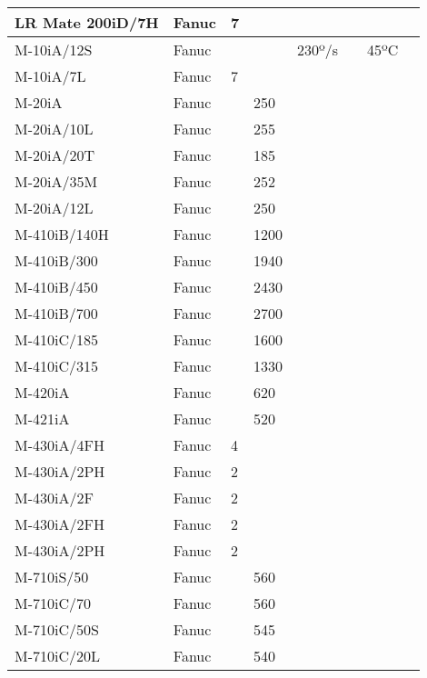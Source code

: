 \begin{longtable}{|p{}|p{}|p{}|p{}|p{}|p{}|p{}|p{}|}
LR Mate 200iD/7H & Fanuc & \cellcolor{red} 7 &  &  &  &  &  \\ \hline
\cellcolor{green} M-10iA/12S & Fanuc &  &  & 230º/s &  & 45ºC &  \\ \hline
M-10iA/7L & Fanuc & \cellcolor{red} 7 &  &  &  &  &  \\ \hline
M-20iA & Fanuc &  & \cellcolor{red} 250 &  &  &  &  \\ \hline
M-20iA/10L & Fanuc &  & \cellcolor{red} 255 &  &  &  &  \\ \hline
M-20iA/20T & Fanuc &  & \cellcolor{red} 185 &  &  &  &  \\ \hline
M-20iA/35M & Fanuc &  & \cellcolor{red} 252 &  &  &  &  \\ \hline
M-20iA/12L & Fanuc &  & \cellcolor{red} 250 &  &  &  &  \\ \hline
M-410iB/140H & Fanuc &  & \cellcolor{red} 1200 &  &  &  &  \\ \hline
M-410iB/300 & Fanuc &  & \cellcolor{red} 1940 &  &  &  &  \\ \hline
M-410iB/450 & Fanuc &  & \cellcolor{red} 2430 &  &  &  &  \\ \hline
M-410iB/700 & Fanuc &  & \cellcolor{red} 2700 &  &  &  &  \\ \hline
M-410iC/185 & Fanuc &  & \cellcolor{red} 1600 &  &  &  &  \\ \hline
M-410iC/315 & Fanuc &  & \cellcolor{red} 1330 &  &  &  &  \\ \hline
M-420iA & Fanuc &  & \cellcolor{red} 620 &  &  &  &  \\ \hline
M-421iA & Fanuc &  & \cellcolor{red} 520 &  &  &  &  \\ \hline
M-430iA/4FH & Fanuc & \cellcolor{red} 4 &  &  &  &  &  \\ \hline
M-430iA/2PH & Fanuc & \cellcolor{red} 2 &  &  &  &  &  \\ \hline
M-430iA/2F & Fanuc & \cellcolor{red} 2 &  &  &  &  &  \\ \hline
M-430iA/2FH & Fanuc & \cellcolor{red} 2 &  &  &  &  &  \\ \hline
M-430iA/2PH & Fanuc & \cellcolor{red} 2 &  &  &  &  &  \\ \hline
M-710iS/50 & Fanuc &  & \cellcolor{red} 560 &  &  &  &  \\ \hline
M-710iC/70 & Fanuc &  & \cellcolor{red} 560 &  &  &  &  \\ \hline
M-710iC/50S & Fanuc &  & \cellcolor{red} 545 &  &  &  &  \\ \hline
M-710iC/20L & Fanuc &  & \cellcolor{red} 540 &  &  &  &  \\ \hline

\end{longtable}
